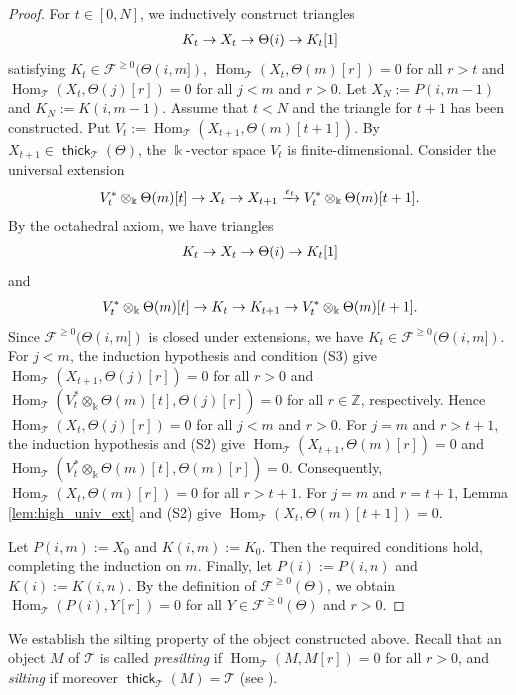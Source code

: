 \documentclass[a4paper,reqno,11pt]{amsart}
\numberwithin{equation}{section}
\theoremstyle{definition}
\newcommand{\F}{\mathcal{F}}
\newcommand{\T}{\mathcal{T}}
\newcommand{\ZZ}{\mathbb{Z}}
\newcommand{\e}{\epsilon}
\newcommand{\bte}{\Theta}
\newcommand{\kk}{\Bbbk}
\newcommand{\xto}{\xrightarrow}
\DeclareMathOperator{\thick}{\mathsf{thick}}
\DeclareMathOperator{\Hom}{Hom}
\begin{document}
\begin{proof}
For $t\in [0,N]$, we inductively construct triangles
\begin{align}
K_{t}\to X_{t}\to \bte(i)\to K_{t}[1]\notag
\end{align}
satisfying $K_{t}\in\F^{\geq 0}(\bte(i,m])$, $\Hom_{\T}(X_{t},\bte(m)[r])=0$ for all $r>t$ and $\Hom_{\T}(X_{t},\bte(j)[r])=0$ for all $j<m$ and $r>0$.
Let $X_{N}:=P(i,m-1)$ and $K_{N}:=K(i,m-1)$.
Assume that $t<N$ and the triangle for $t+1$ has been constructed.
Put $V_{t}:=\Hom_{\T}(X_{t+1},\bte(m)[t+1])$.
By $X_{t+1}\in \thick_{\T}(\bte)$, the $\kk$-vector space $V_{t}$ is finite-dimensional.
Consider the universal extension
\begin{align}
V_{t}^{\ast}\otimes_{\kk}\bte(m)[t] \to X_{t}\to X_{t+1}\xto{\e_{t}}V_{t}^{\ast}\otimes_{\kk}\bte(m)[t+1].\notag
\end{align}
By the octahedral axiom, we have triangles
\begin{align}
K_{t}\to X_{t}\to \bte(i)\to K_{t}[1]\notag
\end{align}
and
\begin{align}
V_{t}^{\ast}\otimes_{\kk}\bte(m)[t]\to K_{t}\to K_{t+1}\to V_{t}^{\ast}\otimes_{\kk}\bte(m)[t+1].\notag
\end{align}
Since $\F^{\geq 0}(\bte(i,m])$ is closed under extensions, we have $K_{t}\in \F^{\geq 0}(\bte(i,m])$.
For $j<m$, the induction hypothesis and condition (S3) give $\Hom_{\T}(X_{t+1},\bte(j)[r])=0$ for all $r>0$ and $\Hom_{\T}(V_{t}^{\ast}\otimes_{\kk}\bte(m)[t],\bte(j)[r])=0$ for all $r\in\ZZ$, respectively.
Hence $\Hom_{\T}(X_{t},\bte(j)[r])=0$ for all $j<m$ and $r>0$.
For $j=m$ and $r>t+1$, the induction hypothesis and (S2) give $\Hom_{\T}(X_{t+1},\bte(m)[r])=0$ and $\Hom_{\T}(V_{t}^{\ast}\otimes_{\kk}\bte(m)[t], \bte(m)[r])=0$.
Consequently, $\Hom_{\T}(X_{t},\bte(m)[r])=0$ for all $r>t+1$.
For $j=m$ and $r=t+1$, Lemma \ref{lem:high_univ_ext} and (S2) give $\Hom_{\T}(X_{t},\bte(m)[t+1])=0$.

Let $P(i,m):=X_{0}$ and $K(i,m):=K_{0}$. Then the required conditions hold, completing the induction on $m$.
Finally, let $P(i):=P(i,n)$ and $K(i):=K(i,n)$.
By the definition of $\F^{\geq 0}(\bte)$, we obtain $\Hom_{\T}(P(i),Y[r])=0$ for all $Y\in\F^{\geq 0}(\bte)$ and $r>0$.
\end{proof}

We establish the silting property of the object constructed above.
Recall that an object $M$ of $\T$ is called \emph{presilting} if $\Hom_{\T}(M,M[r])=0$ for all $r>0$, and \emph{silting} if moreover $\thick_{\T}(M)=\T$ (see \cite{KV88,AI12}).
\end{document}
